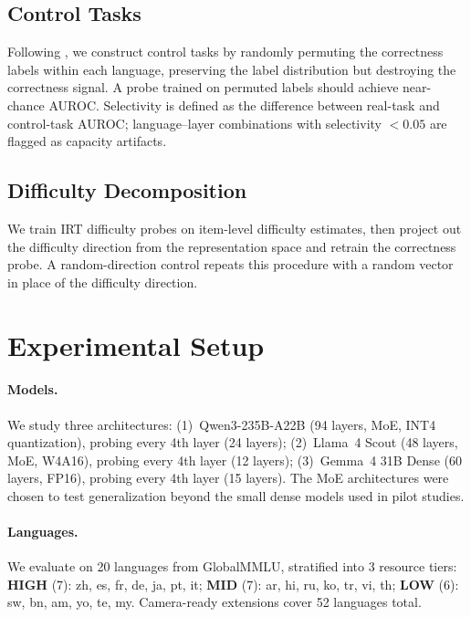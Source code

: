 \documentclass[11pt,a4paper]{article}
\newcommand{\auroc}{AUROC}
\begin{document}
\subsection{Control Tasks}

Following \citet{}, we construct control tasks by randomly permuting the correctness labels within each language, preserving the label distribution but destroying the correctness signal.
A probe trained on permuted labels should achieve near-chance \auroc{}.
Selectivity is defined as the difference between real-task and control-task \auroc{}; language--layer combinations with selectivity $< 0.05$ are flagged as capacity artifacts.

\subsection{Difficulty Decomposition}

We train IRT difficulty probes on item-level difficulty estimates, then project out the difficulty direction from the representation space and retrain the correctness probe.
A random-direction control repeats this procedure with a random vector in place of the difficulty direction.

\section{Experimental Setup}
\label{sec:setup}

\paragraph{Models.}
We study three architectures:
(1)~Qwen3-235B-A22B (94 layers, MoE, INT4 quantization), probing every 4th layer (24 layers);
(2)~Llama~4 Scout (48 layers, MoE, W4A16), probing every 4th layer (12 layers);
(3)~Gemma~4 31B Dense (60 layers, FP16), probing every 4th layer (15 layers).
The MoE architectures were chosen to test generalization beyond the small dense models used in pilot studies.

\paragraph{Languages.}
We evaluate on 20 languages from GlobalMMLU, stratified into 3 resource tiers:
\textbf{HIGH} (7): zh, es, fr, de, ja, pt, it;
\textbf{MID} (7): ar, hi, ru, ko, tr, vi, th;
\textbf{LOW} (6): sw, bn, am, yo, te, my.
Camera-ready extensions cover 52 languages total.
\end{document}
